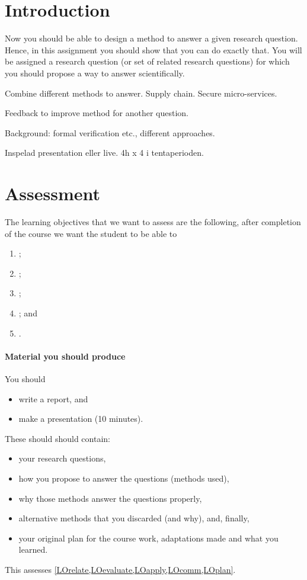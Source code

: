 \mode*

\section{Introduction}

Now you should be able to design a method to answer a given research question.
Hence, in this assignment you should show that you can do exactly that.
You will be assigned a research question (or set of related research questions) 
for which you should propose a way to answer scientifically.

Combine different methods to answer.
Supply chain.
Secure micro-services.

Feedback to improve method for another question.

Background: formal verification etc., different approaches.

Inspelad presentation eller live. 4h x 4 i tentaperioden.


\section{Assessment}\label{Assessment}

The learning objectives that we want to assess are the following, after 
completion of the course we want the student to be able to
\begin{enumerate}[label={(LO\arabic*)},ref=LO\arabic*]
  \item \LOrelate;
  \item \LOevaluate;
  \item \LOapply;
  \item \LOplan; and
  \item \LOcomm.
\end{enumerate}

\paragraph{Material you should produce}

You should
\begin{itemize}
  \item write a report, and
  \item make a presentation (10 minutes).
\end{itemize}
These should should contain:
\begin{itemize}
  \item your research questions,
  \item how you propose to answer the questions (methods used),
  \item why those methods answer the questions properly,
  \item alternative methods that you discarded (and why), and, finally,
  \item your original plan for the course work, adaptations made and what you 
    learned.
\end{itemize}
This assesses \cref{LOrelate,LOevaluate,LOapply,LOcomm,LOplan}.

